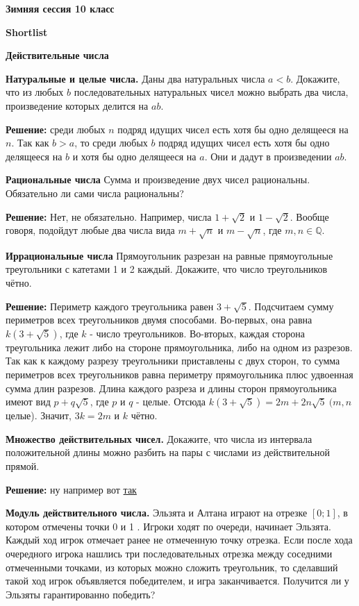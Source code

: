 \centerline{\bf \Huge Зимняя сессия 10 класс}
\centerline{\bf \Huge Shortlist}

\begin{flushright}
        \scriptsize{}
\end{flushright}

\textbf{\large Действительные числа}

\textbf{Натуральные и целые числа.}
Даны два натуральных числа $a<b$. Докажите, что из любых $b$ последовательных натуральных чисел можно выбрать два числа, произведение которых делится на $a b$.

\textbf{Решение:}
среди любых $n$ подряд идущих чисел есть хотя бы одно делящееся на $n$. Так как $b>a$, то среди любых $b$ подряд идущих чисел есть хотя бы одно делящееся на $b$ и хотя бы одно делящееся на $a$. Они и дадут в произведении $ab.$

\textbf{Рациональные числа}
Сумма и произведение двух чисел рациональны. Обязательно ли сами числа рациональны?

\textbf{Решение:}
Нет, не обязательно. Например, числа $1+\sqrt{2}$ и $1-\sqrt{2}$. Вообще говоря, подойдут любые два числа вида $m + \sqrt{n}$ и $m - \sqrt{n}$, где $m, n \in \mathbb{Q}$.

\textbf{Иррациональные числа}
Прямоугольник разрезан на равные прямоугольные треугольники с катетами 1 и 2 каждый. Докажите, что число треугольников чётно.

\textbf{Решение:}
Периметр каждого треугольника равен $3+\sqrt{5}$. Подсчитаем сумму периметров всех треугольников двумя способами. Во-первых, она равна $k(3+\sqrt{5})$, где $k$ - число треугольников. Во-вторых, каждая сторона треугольника лежит либо на стороне прямоугольника, либо на одном из разрезов. Так как к каждому разрезу треугольники приставлены с двух сторон, то сумма периметров всех треугольников равна периметру прямоугольника плюс удвоенная сумма длин разрезов. Длина каждого разреза и длины сторон прямоугольника имеют вид $p+q \sqrt{5}$, где $p$ и $q$ - целые. Отсюда $k(3+\sqrt{5})=2 m+2 n \sqrt{5}\ (m, n$ целые). Значит, $3 k=2 m$ и $k$ чётно.

\textbf{Множество действительных чисел.}
Докажите, что числа из интервала положительной длины можно разбить на пары с числами из действительной прямой.

\textbf{Решение:} ну например вот \href{https://www.geogebra.org/classic/e4pebhrv}{так} 

\textbf{Модуль действительного числа.}
Эльзята и Алтана играют на отрезке $[0 ; 1]$, в котором отмечены точки 0 и 1 . Игроки ходят по очереди, начинает Эльзята. Каждый ход игрок отмечает ранее не отмеченную точку отрезка. Если после хода очередного игрока нашлись три последовательных отрезка между соседними отмеченными точками, из которых можно сложить треугольник, то сделавший такой ход игрок объявляется победителем, и игра заканчивается. Получится ли у Эльзяты гарантированно победить?

